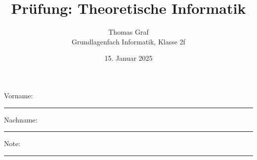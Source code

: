 \newtoggle{withbonus} \togglefalse{withbonus} %

\newcommand{\mycourse}{Grundlagenfach Informatik}
\newcommand{\myclass}{Klasse 2f}
\newcommand{\mydate}{15. Januar 2025}

\title{\textbf{Prüfung: Theoretische Informatik}}
\author{Thomas Graf\\
	\mycourse, \myclass}
\date{\mydate}
\maketitle
\thispagestyle{headandfoot}

\begin{center}
\end{center}
\vspace{10mm}

\begin{center}
	Vorname: \rule{45mm}{0.8pt}\qquad Nachname: \rule{45mm}{0.8pt}
\end{center}
\vspace{20mm}

\begin{center}
	\iftoggle{withbonus} {
		\combinedgradetable[h][questions]
	} {
		\gradetable[h][questions]
	}
\end{center}
\vspace{15mm}
\begin{center}
	Note:
	\vspace{10mm}

	\rule{8mm}{1.2pt}
\end{center}
\clearpage

